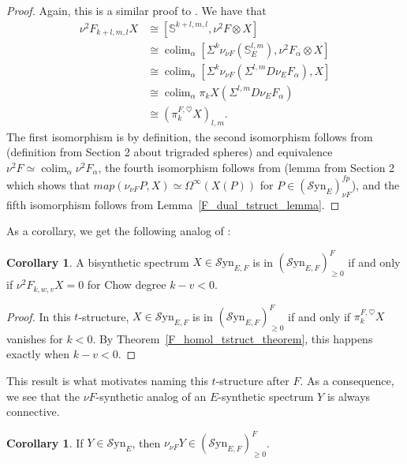 \documentclass[10pt]{amsart}
\theoremstyle{definition}
\numberwithin{figure}{section}
\numberwithin{equation}{section}
\newtheorem{corollary}[figure]{Corollary}
\theoremstyle{cited}
\newcommand{\bS}{\mathbb{S}}
\newcommand{\colim}{\operatorname{colim}}
\newcommand{\Syn}{\mathcal{S}\mathrm{yn}}
\begin{document}
\begin{proof}
    Again, this is a similar proof to \cite[Thm. 4.18]{Pst22}. We have that
    \begin{equation*}
     \begin{aligned}
      \nu^2F_{k+l,m,l}X&\cong [\bS^{k+l,m,l},\nu^2F\otimes X] \\
      &\cong \colim_\alpha[\Sigma^k\nu_{\nu F}(\bS^{l,m}_E),\nu^2F_\alpha\otimes X] \\
      &\cong \colim_\alpha [\Sigma^k\nu_{\nu F}(\Sigma^{l,m}D\nu_EF_\alpha),X] \\
      &\cong \colim_\alpha \pi_kX(\Sigma^{l,m}D\nu_EF_\alpha) \\
      &\cong (\pi_k^{F,\heartsuit}X)_{l,m}.
    \end{aligned}   
    \end{equation*}
 The first isomorphism is by definition, the second isomorphism follows from (definition from Section 2 about trigraded spheres) and equivalence $\nu^2F\simeq\colim_\alpha \nu^2F_\alpha$, the fourth isomorphism follows from (lemma from Section 2 which shows that $map(\nu_{\nu F}P,X)\simeq \Omega^\infty(X(P))$ for $P\in(\Syn_E)_{\nu F}^{fp}$), and the fifth isomorphism follows from Lemma~\ref{F_dual_tstruct_lemma}.   
\end{proof}

As a corollary, we get the following analog of \cite[Cor. 4.19]{Pst22}:

\begin{corollary}
\label{F_chow_degree_cor}
A bisynthetic spectrum $X\in\Syn_{E,F}$ is in $(\Syn_{E,F})_{\geq 0}^F$ if and only if $\nu^2F_{k,w,v}X =0$ for Chow degree $k-v<0$. 
\end{corollary}

\begin{proof}
    In this $t$-structure, $X\in\Syn_{E,F}$ is in $(\Syn_{E,F})_{\geq 0}^F$ if and only if $\pi_k^{F,\heartsuit}X$ vanishes for $k<0$. By Theorem~\ref{F_homol_tstruct_theorem}, this happens exactly when $k-v<0$.
\end{proof}

This result is what motivates naming this $t$-structure after $F$. As a consequence, we see that the $\nu F$-synthetic analog of an $E$-synthetic spectrum $Y$ is always connective.

\begin{corollary}
    If $Y\in\Syn_E$, then $\nu_{\nu F}Y\in (\Syn_{E,F})_{\geq 0}^F$.
\end{corollary}
\end{document}
